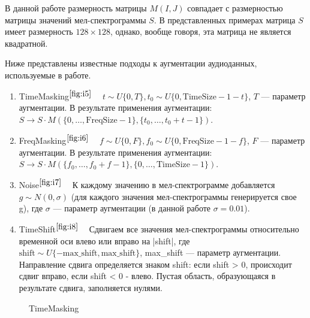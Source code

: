\documentclass[12pt, fleqn]{article}
\begin{document}
В данной работе размерность матрицы $M(I, J)$ совпадает с размерностью матрицы значений мел-спектрограммы $S$. В представленных примерах матрица $S$ имеет размерность $128\times128$, однако, вообще говоря, эта матрица не является квадратной.

Ниже представлены известные подходы к аугментации аудиоданных, используемые в работе.
\begin{enumerate}
	\item TimeMasking$^{\ref{fig:i5}}$ ~\cite{SpecAugment} \newline 
	$t \sim U\{0, T\}, t_0 \sim U\{0, \text{TimeSize} - 1 - t\}$, $T$ --- параметр аугментации. \newline 
	В результате применения аугментации: \newline
	$S \rightarrow S \cdot M(\{0, \ldots, \text{FreqSize} - 1\}, \{t_0, \ldots, t_0 + t - 1\})$.
	\item FreqMasking$^{\ref{fig:i6}}$ ~\cite{SpecAugment} \newline
	$f \sim U\{0, F\}, f_0 \sim U\{0, \text{FreqSize} - 1 - f\}$, $F$ --- параметр аугментации. \newline
	В результате применения аугментации: \newline
	$S \rightarrow S \cdot M(\{f_0, \ldots, f_0 + f - 1\}, \{0, \ldots, \text{TimeSize} - 1\})$.
	\item Noise$^{\ref{fig:i7}}$ ~\cite{AudioClassification}  \newline 
	К каждому значению в мел-спектрограмме добавляется $g \sim N(0, \sigma)$ (для каждого значения мел-спектрограммы генерируется свое g), где $\sigma$ --- параметр аугментации (в данной работе $\sigma = 0.01$). 
	\item TimeShift$^{\ref{fig:i8}}$ ~\cite{AudioClassification} \newline Сдвигаем все значения мел-спектрограммы относительно временной оси влево или вправо на |shift|, где $\text{shift} \sim U\{-\text{max\_shift}, \text{max\_shift}\}$, max\_shift --- параметр аугментации. Направление сдвига определяется знаком shift: если \newline shift > 0, происходит сдвиг вправо, если shift < 0 - влево. Пустая область, образующаяся в результате сдвига, заполняется нулями.
\end{enumerate}

\begin{figure}[ht!]
		\caption{TimeMasking}
		\label{fig:i5}
\end{figure}
\end{document}
